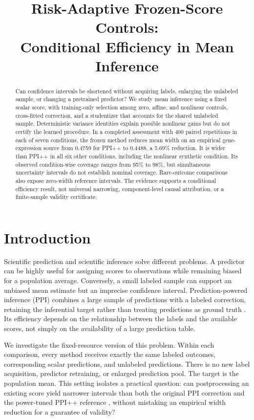 \documentclass{article}
\title{Risk-Adaptive Frozen-Score Controls:\\Conditional Efficiency in Mean Inference}
\author{}
\begin{document}
\maketitle

\begin{abstract}
Can confidence intervals be shortened without acquiring labels, enlarging the unlabeled sample, or changing a pretrained predictor? We study mean inference using a fixed scalar score, with training-only selection among zero, affine, and nonlinear controls, cross-fitted correction, and a studentizer that accounts for the shared unlabeled sample. Deterministic variance identities explain possible nonlinear gains but do not certify the learned procedure. In a completed assessment with 400 paired repetitions in each of seven conditions, the frozen method reduces mean width on an empirical gene-expression source from 0.4759 for PPI++ to 0.4488, a 5.69\% reduction. It is wider than PPI++ in all six other conditions, including the nonlinear synthetic condition. Its observed condition-wise coverage ranges from 95\% to 98\%, but simultaneous uncertainty intervals do not establish nominal coverage. Rare-outcome comparisons also expose zero-width reference intervals. The evidence supports a conditional efficiency result, not universal narrowing, component-level causal attribution, or a finite-sample validity certificate.
\end{abstract}

\section{Introduction}
Scientific prediction and scientific inference solve different problems. A predictor can be highly useful for assigning scores to observations while remaining biased for a population average. Conversely, a small labeled sample can support an unbiased mean estimate but an imprecise confidence interval. Prediction-powered inference (PPI) combines a large sample of predictions with a labeled correction, retaining the inferential target rather than treating predictions as ground truth \citep{PPI}. Its efficiency depends on the relationship between the labels and the available scores, not simply on the availability of a large prediction table.

We investigate the fixed-resource version of this problem. Within each comparison, every method receives exactly the same labeled outcomes, corresponding scalar predictions, and unlabeled predictions. There is no new label acquisition, predictor retraining, or enlarged prediction pool. The target is the population mean. This setting isolates a practical question: can postprocessing an existing score yield narrower intervals than both the original PPI correction and the power-tuned PPI++ reference \citep{PPIPlus}, without mistaking an empirical width reduction for a guarantee of validity?
\end{document}

